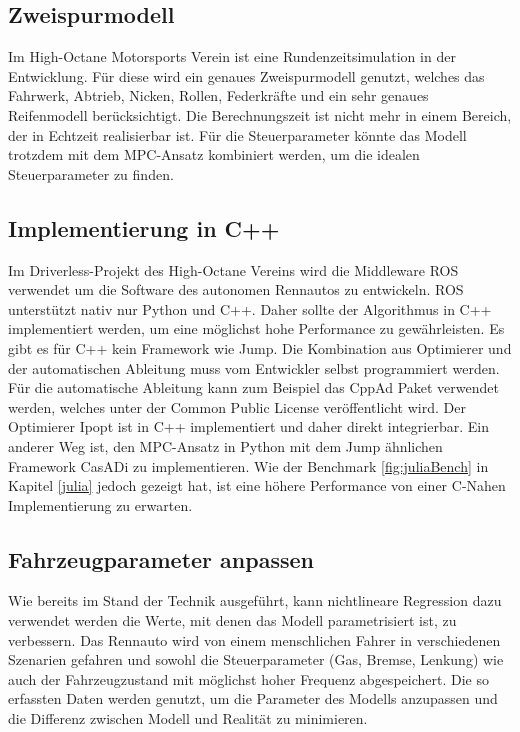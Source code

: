 \documentclass{like}
\begin{document}
\subsection{Zweispurmodell}
Im High-Octane Motorsports Verein ist eine Rundenzeitsimulation in der Entwicklung. Für diese wird ein genaues Zweispurmodell genutzt, welches das Fahrwerk, Abtrieb, Nicken, Rollen, Federkräfte und ein sehr genaues Reifenmodell berücksichtigt. Die Berechnungszeit ist nicht mehr in einem Bereich, der in Echtzeit realisierbar ist. Für die Steuerparameter könnte das Modell trotzdem mit dem \ac{MPC}-Ansatz kombiniert werden, um die idealen Steuerparameter zu finden.

\subsection{Implementierung in C++}
Im Driverless-Projekt des High-Octane Vereins wird die Middleware \ac{ROS} verwendet um die Software des autonomen Rennautos zu entwickeln. \ac{ROS} unterstützt nativ nur Python und C++. Daher sollte der Algorithmus in C++ implementiert werden, um eine möglichst hohe Performance zu gewährleisten. 
Es gibt es für C++  kein Framework wie \ac{Jump}. Die Kombination aus Optimierer und der automatischen Ableitung muss vom Entwickler selbst programmiert werden. Für die automatische Ableitung kann zum Beispiel das CppAd Paket verwendet werden, welches unter der Common Public License veröffentlicht wird. Der Optimierer \ac{Ipopt} ist in C++ implementiert und daher direkt integrierbar. 
Ein anderer Weg ist, den \ac{MPC}-Ansatz in Python mit dem \ac{Jump} ähnlichen Framework CasADi zu implementieren. Wie der Benchmark \ref{fig:juliaBench} in Kapitel \ref{julia} jedoch gezeigt hat, ist eine höhere Performance von einer C-Nahen Implementierung zu erwarten. 

\subsection{Fahrzeugparameter anpassen}
Wie bereits im Stand der Technik ausgeführt, kann nichtlineare Regression dazu verwendet werden die Werte, mit denen das Modell parametrisiert ist, zu verbessern. Das Rennauto wird von einem menschlichen Fahrer in verschiedenen Szenarien gefahren und sowohl die Steuerparameter (Gas, Bremse, Lenkung) wie auch der Fahrzeugzustand mit möglichst hoher Frequenz abgespeichert. Die so erfassten Daten werden genutzt, um die Parameter des Modells anzupassen und die Differenz zwischen Modell und Realität zu minimieren. 


\appendix

%



%


\listoffigures
\listoftables

%


\end{document}

